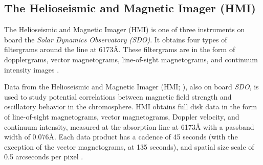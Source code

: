 \subsection{The Helioseismic and Magnetic Imager (HMI)}

The Helioseismic and Magnetic Imager (HMI)
is one of three instruments on board
the \textit{Solar Dynamics Observatory (SDO)}. It obtains four types of
filtergrams around the  line at 6173\AA{}. These filtergrams are
in the form of dopplergrams, vector magnetograms, line-of-sight magnetograms,
and continuum intensity images \citep{hmi}.


Data from
the Helioseismic and Magnetic Imager (HMI; \cite{Scherrer2012}),
also on board \textit{SDO}, is used to study potential
correlations between magnetic field strength and oscillatory
behavior in the chromosphere.
HMI obtains full disk data in the form of
line-of-sight magnetograms, vector magnetograms,
Doppler velocity, and continuum intensity,
measured at the  absorption line at 6173\AA{}
with a passband width of 0.076\AA{}.
Each data product has a cadence of 45 seconds (with the exception
of the vector magnetograms, at 135 seconds),
and {spatial size scale} of 0.5 arcseconds per pixel
\citep{Schou2012}.
